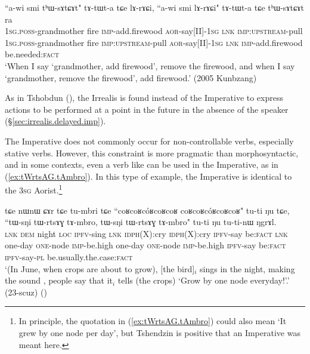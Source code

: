 \begin{exe}
\ex \label{ex:thWsAtCAt.lArACi}
\gll ``a-wi smi tʰɯ-sɤtɕɤt" tɤ-tɯt-a tɕe lɤ-rɤɕi, ``a-wi smi lɤ-rɤɕi" tɤ-tɯt-a tɕe tʰɯ-sɤtɕɤt ra \\
\textsc{1sg}.\textsc{poss}-grandmother fire \textsc{imp}-add.firewood \textsc{aor}-say[II]-\textsc{1sg} \textsc{lnk} \textsc{imp}:\textsc{upstream}-pull \textsc{1sg}.\textsc{poss}-grandmother fire \textsc{imp}:\textsc{upstream}-pull  \textsc{aor}-say[II]-\textsc{1sg} \textsc{lnk} \textsc{imp}-add.firewood be.needed:\textsc{fact} \\
\glt `When I say `grandmother, add firewood', remove the firewood, and when I say `grandmother, remove the firewood', add firewood.' (2005 Kunbzang) 
\end{exe}

As in Tshobdun (\citealt[809]{jackson07irrealis}), the Irrealis is found instead of the Imperative to express actions to be performed at a point in the future in the absence of the speaker (§\ref{sec:irrealis.delayed.imp}). 

The Imperative does not commonly occur for non-controllable verbs, especially stative verbs. However, this constraint is more pragmatic than morphosyntactic, and in some contexts, even a verb like  can be used in the Imperative, as in (\ref{ex:tWrtsAG.tAmbro}). In this type of example, the Imperative  is identical to the \textsc{3sg} Aorist.\footnote{In principle, the quotation in (\ref{ex:tWrtsAG.tAmbro}) could also mean `It grew by one node per day', but Tshendzin is positive that an Imperative was meant here. }

\begin{exe}
\ex \label{ex:tWrtsAG.tAmbro}
\gll tɕe nɯnɯ ɕɤr tɕe tu-mbri tɕe ``coʁcoʁcóʁcoʁcoʁ coʁcoʁcóʁcoʁcoʁ" tu-ti ŋu tɕe, ``tɯ-sŋi tɯ-rtsɤɣ tɤ-mbro, tɯ-sŋi tɯ-rtsɤɣ tɤ-mbro" tu-ti ŋu tu-ti-nɯ ŋgrɤl. \\
\textsc{lnk} \textsc{dem} night \textsc{loc} \textsc{ipfv}-sing \textsc{lnk} \textsc{idph}(X):cry  \textsc{idph}(X):cry \textsc{ipfv}-say be:\textsc{fact} \textsc{lnk} one-day \textsc{one}-node \textsc{imp}-be.high one-day \textsc{one}-node \textsc{imp}-be.high \textsc{ipfv}-say be:\textsc{fact} \textsc{ipfv}-say-\textsc{pl} be.usually.the.case:\textsc{fact}  \\
\glt `(In June, when crops are about to grow), [the  bird]$_i$ sings in the night, making the sound , people say that it$_i$  tells (the crops) `Grow by one node everyday!'.' (23-scuz)
()
\end{exe}

